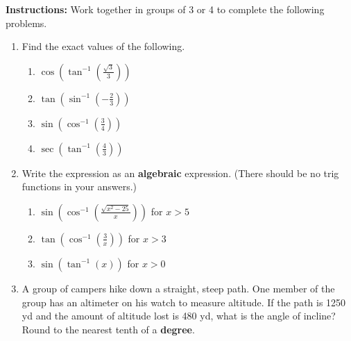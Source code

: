 


\noindent \textbf{Instructions:}  Work together in groups of  3 or 4 to complete the following problems.\\

\begin{enumerate}

\item Find the exact values of the following.
\begin{enumerate}

\item $\cos \left( \tan^{-1}\left(\frac{\sqrt{3}}{3}\right)\right)$

\vfill
\item $\tan \left( \sin^{-1}\left(-\frac{2}{3}\right)\right)$


\vfill

\item $\sin \left( \cos^{-1}\left(\frac{3}{4}\right)\right)$
\vfill

\item $\sec \left( \tan^{-1}\left(\frac{4}{3}\right)\right)$
\vfill

\end{enumerate}



\clearpage
\item Write the expression as an \textbf{algebraic} expression.
  (There should be no trig functions in your answers.)

\begin{enumerate}

\item $\displaystyle \sin \left( \cos^{-1}\left(\frac{\sqrt{x^2-25}}{x}\right)\right)$ for $x>5$

\vfill

\item $\displaystyle \tan \left( \cos^{-1}\left(\frac{3}{x}\right)\right)$ for $x>3$
\vfill

\item $\displaystyle \sin \left( \tan^{-1}\left(x\right)\right)$ for $x>0$
\vfill


\end{enumerate}


\clearpage

\item A group of campers hike down a straight, steep path.  One member
  of the group has an altimeter on his watch to measure altitude.  If
  the path is 1250 yd and the amount of altitude lost is 480 yd, what
  is the angle of incline?  Round to the nearest tenth of a
  \textbf{degree}.


\end{enumerate}
